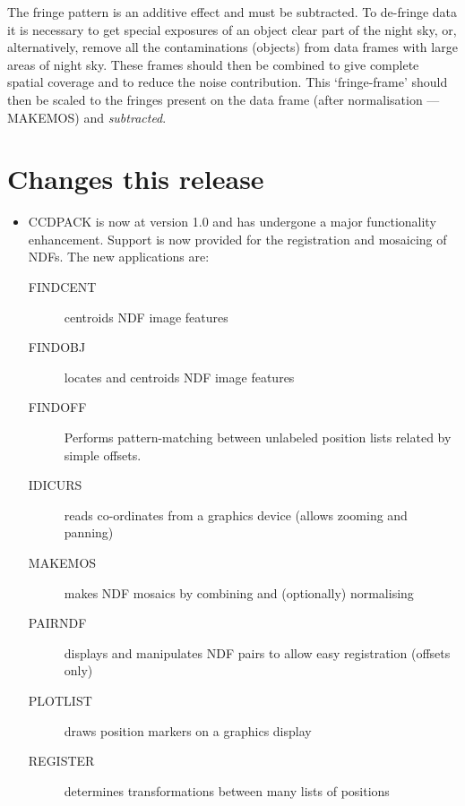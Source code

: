 The fringe pattern is an additive effect and must be subtracted. To
de-fringe data it is necessary to get special exposures of an object
clear part of the night sky, or, alternatively, remove all the
contaminations (objects) from data frames with large areas of night sky.
These frames should then be combined to give complete spatial coverage
and to reduce the noise contribution. This `fringe-frame' should then be
scaled to the fringes present on the data frame (after normalisation
--- MAKEMOS) and {\em subtracted}.


\section{Changes this release}

\begin{itemize}

\item CCDPACK is now at version 1.0 and has undergone a major 
      functionality enhancement. Support is now provided for the 
      registration and mosaicing of NDFs. The new applications are:

      \begin{description}
      \item[FINDCENT] centroids NDF image features

      \item[FINDOBJ] locates and centroids NDF image features

      \item[FINDOFF] Performs pattern-matching between unlabeled 
                     position lists related by simple offsets.

     \item[IDICURS] reads co-ordinates from a graphics device (allows 
                    zooming and panning)

    \item[MAKEMOS] makes NDF mosaics by combining and (optionally) 
                   normalising

     \item[PAIRNDF] displays and manipulates NDF pairs to allow easy
                    registration (offsets only)

    \item[PLOTLIST] draws position markers on a graphics display

    \item[REGISTER] determines transformations between many lists of 
                    positions


\end{description}
\end{itemize}
